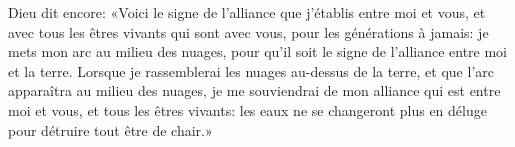 Dieu dit encore:
	«Voici le signe de l’alliance que j’établis entre moi et vous,
	et avec tous les êtres vivants qui sont avec vous,
		pour les générations à jamais:
	je mets mon arc au milieu des nuages,
	pour qu’il soit le signe de l’alliance entre moi et la terre.
Lorsque je rassemblerai les nuages au-dessus de la terre,
	et que l’arc apparaîtra au milieu des nuages,
	je me souviendrai de mon alliance qui est entre moi et vous,
	et tous les êtres vivants:
	les eaux ne se changeront plus en déluge pour détruire tout être de chair.»
